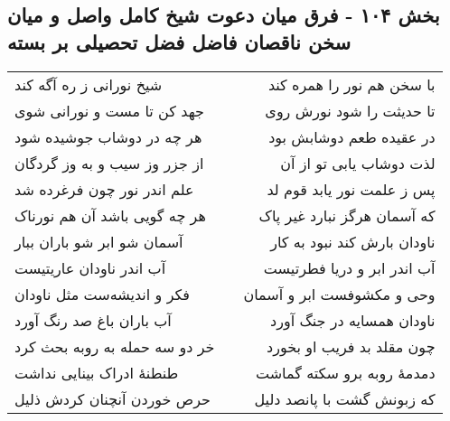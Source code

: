 \begin{center}
\section*{بخش ۱۰۴ - فرق میان دعوت شیخ کامل واصل و میان سخن ناقصان  فاضل فضل تحصیلی بر بسته}
\label{sec:sh104}
\begin{longtable}{l p{0.5cm} r}
شیخ نورانی ز ره آگه کند
&&
با سخن هم نور را همره کند
\\
جهد کن تا مست و نورانی شوی
&&
تا حدیثت را شود نورش روی
\\
هر چه در دوشاب جوشیده شود
&&
در عقیده طعم دوشابش بود
\\
از جزر وز سیب و به وز گردگان
&&
لذت دوشاب یابی تو از آن
\\
علم اندر نور چون فرغرده شد
&&
پس ز علمت نور یابد قوم لد
\\
هر چه گویی باشد آن هم نورناک
&&
که آسمان هرگز نبارد غیر پاک
\\
آسمان شو ابر شو باران ببار
&&
ناودان بارش کند نبود به کار
\\
آب اندر ناودان عاریتیست
&&
آب اندر ابر و دریا فطرتیست
\\
فکر و اندیشه‌ست مثل ناودان
&&
وحی و مکشوفست ابر و آسمان
\\
آب باران باغ صد رنگ آورد
&&
ناودان همسایه در جنگ آورد
\\
خر دو سه حمله به روبه بحث کرد
&&
چون مقلد بد فریب او بخورد
\\
طنطنهٔ ادراک بینایی نداشت
&&
دمدمهٔ روبه برو سکته گماشت
\\
حرص خوردن آنچنان کردش ذلیل
&&
که زبونش گشت با پانصد دلیل
\\
\end{longtable}
\end{center}
